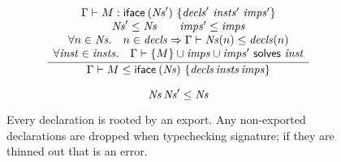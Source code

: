 \begin{figure}


\[
\frac{
\begin{array}{c}
\Gamma \vdash M : \mathsf{iface}\:(\mathit{Ns}')~\{\mathit{decls}'~\mathit{insts}'~\mathit{imps}'\} \\
\mathit{Ns}' \le \mathit{Ns} \qquad
\mathit{imps}' \le \mathit{imps} \\
\forall n \in \mathit{Ns}.\quad n \in \mathit{decls} \Rightarrow \Gamma \vdash \mathit{Ns}(n) \le \mathit{decls}(n) \\
\forall \mathit{inst} \in \mathit{insts}.\quad \Gamma \vdash \{ M \} \cup \mathit{imps} \cup \mathit{imps}' ~\textsf{solves}~ \mathit{inst}
\end{array}
}{
\Gamma \vdash M \le \mathsf{iface}\:(\mathit{Ns})~\{\mathit{decls}\, \mathit{insts}\, \mathit{imps}\}
}
\]


\[
\mathit{Ns}\, \mathit{Ns}' \le \mathit{Ns}
\]

\caption{
Every declaration is rooted by an export.  Any non-exported declarations are dropped when typechecking signature; if they are thinned out that is an error.
}


\end{figure}



